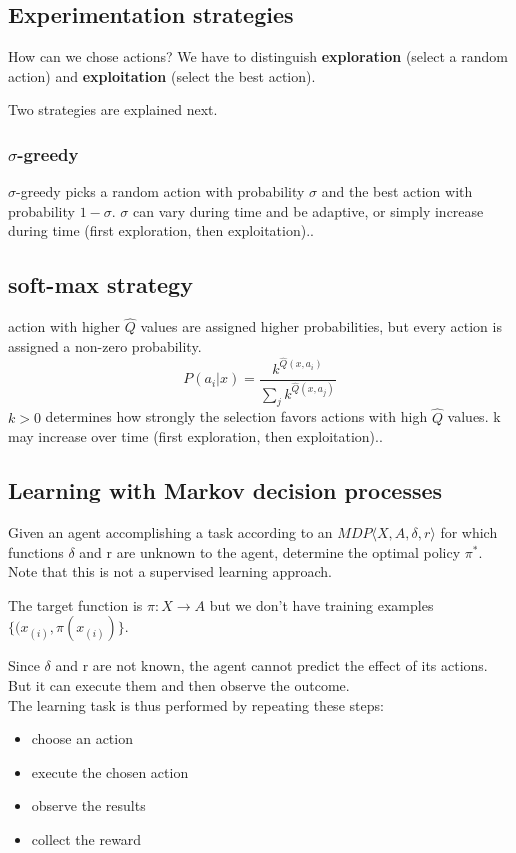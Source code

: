 \subsection{Experimentation strategies}

How can we chose actions? We have to distinguish \textbf{exploration} (select a random action) and \textbf{exploitation} (select the best action).

Two strategies are explained next.

\subsubsection{$\sigma$-greedy}
$\sigma$-greedy picks a random action with probability $\sigma$ and the best action with probability $1 - \sigma$. $\sigma$ can vary during time and be adaptive, or simply increase during time (first exploration, then exploitation)..

\subsection{soft-max strategy}
action with higher $\hat{Q}$ values are assigned higher probabilities, but every action is assigned a non-zero probability.
\begin{equation}
    P(a_{i}|x) = \frac{k^{\hat{Q}(x, a_{i})}}{\sum_{j} k^{\hat{Q}(x, a_{j})}}
\end{equation}
$k > 0$ determines how strongly the selection favors actions with high $\hat{Q}$ values. k may increase over time (first exploration, then exploitation)..


 \subsection{Learning with Markov decision processes}
 Given an agent accomplishing a task according to an $MDP\langle X, A, \delta, r \rangle$ for which functions $\delta$ and r are unknown to the agent, determine the optimal policy $\pi^{*}$. Note that this is not a supervised learning approach.

 The target function is $\pi: X \xrightarrow{} A$ but we don't have training examples $\{(x_{(i)}, \pi(x_{(i)})\}$. 

 Since $\delta$ and r are not known, the agent cannot predict the effect of its actions. But it can execute them and then observe the outcome.\\
 The learning task is thus performed by repeating these steps:
 \begin{itemize}
     \item choose an action
     \item execute the chosen action
     \item observe the results
     \item collect the reward
 \end{itemize}



